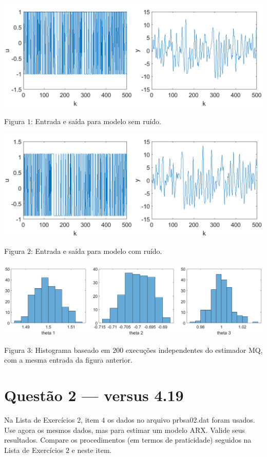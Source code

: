 \documentclass{rbfin}
\begin{document}
\begin{center}
\includegraphics[scale=0.65]{18_1}

Figura $1$: Entrada e saída para modelo sem ruído.
\end{center}

\begin{center}
\includegraphics[scale=0.65]{18_3}

Figura $2$: Entrada e saída para modelo com ruído.
\end{center}

\begin{center}
\includegraphics[scale=0.44]{18_5}

Figura $3$: Histograma baseado em $200$ execuções independentes do estimador MQ, com a mesma entrada da figura anterior.
\end{center}

\section*{Questão 2 --- versus 4.19}

Na Lista de Exercícios $2$, item $4$ os dados no arquivo prbsa02.dat
foram usados. Use agora os mesmos dados, mas para estimar um modelo
ARX. Valide seus resultados. Compare os procedimentos (em termos de
praticidade) seguidos na Lista de Exercícios $2$ e neste item.
\end{document}

